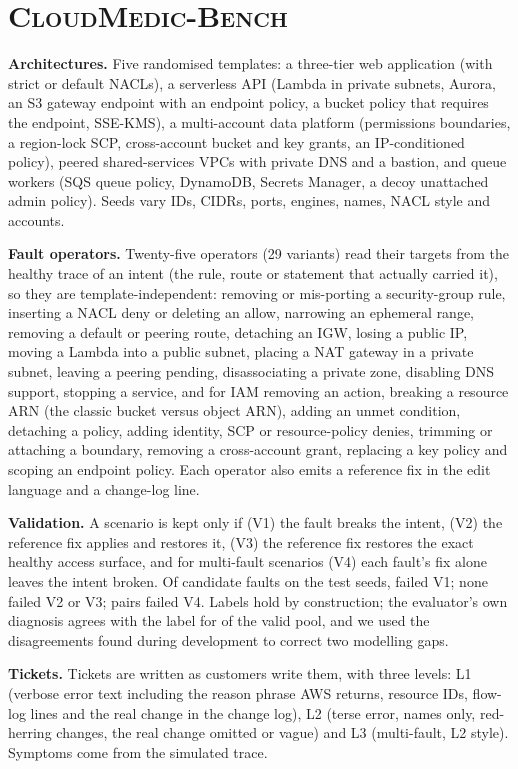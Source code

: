 \documentclass[conference]{IEEEtran}
\newcommand{\bench}{\textsc{CloudMedic-Bench}}
\begin{document}
\section{\bench}\label{sec:bench}
\textbf{Architectures.} Five randomised templates: a three-tier web application (with strict or default NACLs), a serverless
API (Lambda in private subnets, Aurora, an S3 gateway endpoint with an endpoint policy, a bucket policy that requires the
endpoint, SSE-KMS), a multi-account data platform (permissions boundaries, a region-lock SCP, cross-account bucket and key
grants, an IP-conditioned policy), peered shared-services VPCs with private DNS and a bastion, and queue workers (SQS queue
policy, DynamoDB, Secrets Manager, a decoy unattached admin policy). Seeds vary IDs, CIDRs, ports, engines, names, NACL style
and accounts.

\textbf{Fault operators.} Twenty-five operators (29 variants) read their targets from the healthy trace of an intent (the rule, route or
statement that actually carried it), so they are template-independent: removing or mis-porting a security-group rule,
inserting a NACL deny or deleting an allow, narrowing an ephemeral range, removing a default or peering route, detaching an
IGW, losing a public IP, moving a Lambda into a public subnet, placing a NAT gateway in a private subnet, leaving a peering
pending, disassociating a private zone, disabling DNS support, stopping a service, and for IAM removing an action, breaking a
resource ARN (the classic bucket versus object ARN), adding an unmet condition, detaching a policy, adding identity, SCP or
resource-policy denies, trimming or attaching a boundary, removing a cross-account grant, replacing a key policy and scoping an
endpoint policy. Each operator also emits a reference fix in the edit language and a change-log line.

\textbf{Validation.} A scenario is kept only if (V1) the fault breaks the intent, (V2) the reference fix applies and restores it,
(V3) the reference fix restores the exact healthy access surface, and for multi-fault scenarios (V4) each fault's fix alone
leaves the intent broken. Of \NCandidates{} candidate faults on the test seeds, \NDropOne{} failed V1; none failed V2 or V3;
\NDropFour{} pairs failed V4. Labels hold by construction; the evaluator's own diagnosis agrees with the label for
\Agreement{} of the valid pool, and we used the disagreements found during development to correct two modelling gaps.

\textbf{Tickets.} Tickets are written as customers write them, with three levels: L1 (verbose error text including the
reason phrase AWS returns, resource IDs, flow-log lines and the real change in the change log), L2 (terse error, names only,
red-herring changes, the real change omitted or vague) and L3 (multi-fault, L2 style). Symptoms come from the simulated trace.
\end{document}
